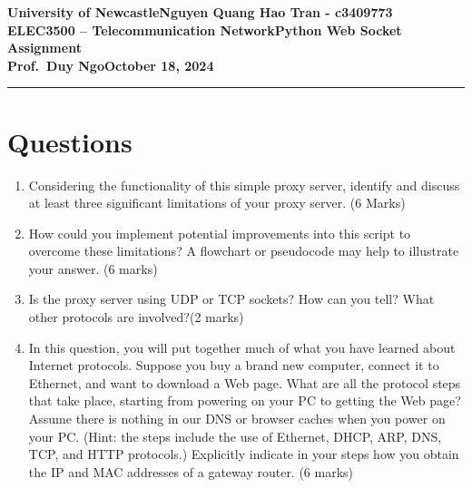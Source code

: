 \documentclass[11pt]{article}
\newcommand{\myname}{Nguyen Quang Hao Tran - c3409773}
\newcommand{\assignment}{Python Web Socket Assignment}
\newcommand{\duedate}{October 18, 2024}
\begin{document}
	
	\textbf{University of Newcastle}\hfill\textbf{\myname}\\[0.01in]
	\textbf{ELEC3500 -- Telecommunication Network}\hfill\textbf{\assignment}\\[0.01in]
	\textbf{Prof.\ Duy Ngo}\hfill\textbf{\duedate}\\
	\smallskip\hrule\bigskip
	
	\section{Questions}
	\begin{enumerate}
		\item Considering the functionality of this simple proxy server, identify and discuss at least three significant limitations of your proxy server. (6 Marks)
		
		\item How could you implement potential improvements into this script to overcome
		these limitations? A flowchart or pseudocode may help to illustrate your answer. (6 marks)
		
		\item Is the proxy server using UDP or TCP sockets? How can you tell? What
		other protocols are involved?(2 marks)
		
		\item In this question, you will put together much of what you have learned about
		Internet protocols. Suppose you buy a brand new computer, connect it to Ethernet, and want to download a Web page. What are all the protocol steps that take place, starting from powering on your PC to getting the Web page? Assume there is nothing in our DNS or browser caches when you power on your PC. (Hint: the steps include the use of Ethernet, DHCP, ARP, DNS, TCP, and HTTP protocols.) Explicitly indicate in your steps how you obtain the IP and MAC addresses of a gateway router. (6 marks)
	\end{enumerate}
\end{document}
